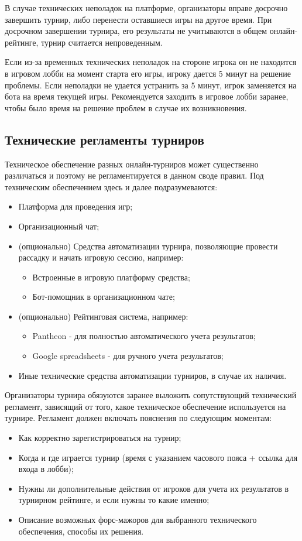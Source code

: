 В случае технических неполадок на платформе, организаторы вправе досрочно завершить турнир, либо перенести оставшиеся игры на другое время. При досрочном завершении турнира, его результаты не учитываются в общем онлайн-рейтинге, турнир считается непроведенным.

Если из-за временных технических неполадок на стороне игрока он не находится в игровом лобби на момент старта его игры, игроку дается 5 минут на решение проблемы. Если неполадки не удается устранить за 5 минут, игрок заменяется на бота на время текущей игры. Рекомендуется заходить в игровое лобби заранее, чтобы было время на решение проблем в случае их возникновения.

\subsection{Технические регламенты турниров}

Техническое обеспечение разных онлайн-турниров может существенно различаться и поэтому не регламентируется в данном своде правил. Под техническим обеспечением здесь и далее подразумеваются:

\begin{itemize}
	\item Платформа для проведения игр;
	\item Организационный чат;
	\item (опционально) Средства автоматизации турнира, позволяющие провести рассадку и начать игровую сессию, например:
	\begin{itemize}
		\item Встроенные в игровую платформу средства;
		\item Бот-помощник в организационном чате;
	\end{itemize}
	\item (опционально) Рейтинговая система, например:
	\begin{itemize}
		\item Pantheon - для полностью автоматического учета результатов;
		\item Google spreadsheets - для ручного учета результатов;
	\end{itemize}
	\item Иные технические средства автоматизации турниров, в случае их наличия.
\end{itemize}


Организаторы турнира обязуются заранее выложить сопутствующий технический регламент, зависящий от того, какое техническое обеспечение используется на турнире. Регламент должен включать пояснения по следующим моментам:
\begin{itemize}
	\item Как корректно зарегистрироваться на турнир;
	\item Когда и где играется турнир (время с указанием часового пояса + ссылка для входа в лобби);
	\item Нужны ли дополнительные действия от игроков для учета их результатов в турнирном рейтинге, и если нужны то какие именно;
	\item Описание возможных форс-мажоров для выбранного технического обеспечения, способы их решения.
\end{itemize}
